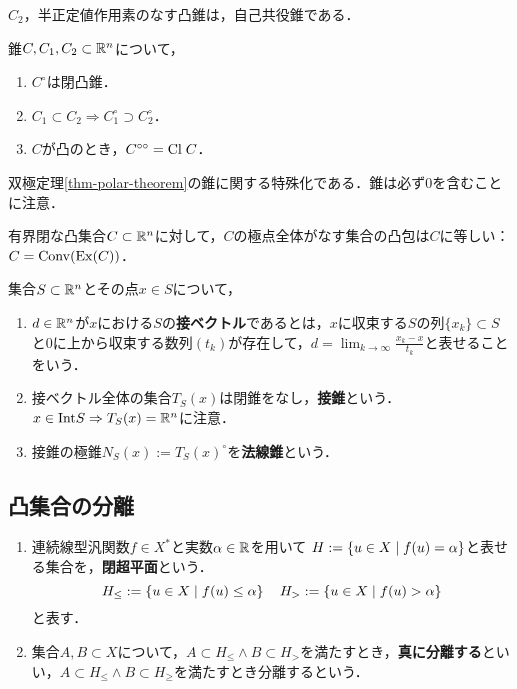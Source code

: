 \documentclass[uplatex,dvipdfmx]{jsreport}
\begin{document}
\begin{example}[自己共役錐]
    $C_2$，半正定値作用素のなす凸錐は，自己共役錐である．
\end{example}

\begin{corollary}[双極定理]
    錐$C,C_1,C_2\subset\mathbb{R}^n$について，
    \begin{enumerate}
        \item $C^\circ$は閉凸錐．
        \item $C_1\subset C_2\Rightarrow C_1^\circ\supset C_2^\circ$．
        \item $C$が凸のとき，$C^{\circ\circ}=\mathrm{Cl}\;C$．
    \end{enumerate}
\end{corollary}
\begin{Proof}
    双極定理\ref{thm-polar-theorem}の錐に関する特殊化である．錐は必ず$0$を含むことに注意．
\end{Proof}

\begin{corollary}
    有界閉な凸集合$C\subset\mathbb{R}^n$に対して，$C$の極点全体がなす集合の凸包は$C$に等しい：$C=\mathrm{Conv}(\mathrm{Ex}(C))$．
\end{corollary}

\begin{definition}
    集合$S\subset\mathbb{R}^n$とその点$x\in S$について，
    \begin{enumerate}
        \item $d\in\mathbb{R}^n$が$x$における$S$の\textbf{接ベクトル}であるとは，$x$に収束する$S$の列$\{x_k\}\subset S$と$0$に上から収束する数列$(t_k)$が存在して，$d=\lim_{k\to\infty}\frac{x_k-x}{t_k}$と表せることをいう．
        \item 接ベクトル全体の集合$T_S(x)$は閉錐をなし，\textbf{接錐}という．$x\in\mathrm{Int} S\Rightarrow T_S(x)=\mathbb{R}^n$に注意．
        \item 接錐の極錐$N_S(x):=T_S(x)^\circ$を\textbf{法線錐}という．
    \end{enumerate}
\end{definition}

\subsection{凸集合の分離}

\begin{definition}\mbox{}
    \begin{enumerate}
        \item 連続線型汎関数$f\in X^*$と実数$\alpha\in\mathbb{R}$を用いて
        $H:=\left\{u\in X\mid f(u)=\alpha\right\}$と表せる集合を，\textbf{閉超平面}という．
        \[H_\le:=\left\{u\in X\mid f(u)\le\alpha\right\}\quad H_>:=\left\{u\in X\mid f(u)>\alpha\right\}\]
        と表す．
        \item 集合$A,B\subset X$について，$A\subset H_\le\land B\subset H_>$を満たすとき，\textbf{真に分離する}といい，$A\subset H_\le\land B\subset H_\ge$を満たすとき分離するという．
    \end{enumerate}
\end{definition}
\end{document}

